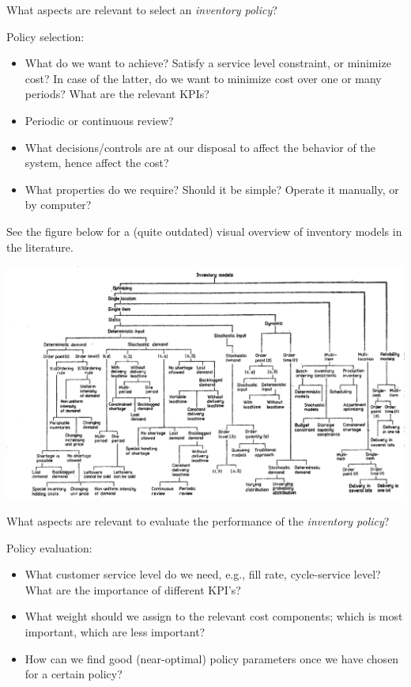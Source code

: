 \begin{exercise}
  What aspects are relevant to select an \emph{inventory policy}?
\begin{solution}
 Policy selection:
      \begin{itemize}
      \item What do we want to achieve? Satisfy a service level
        constraint, or minimize cost? In case of the latter, do we
        want to minimize cost over one or many periods? What are the relevant KPIs? 
      \item Periodic or continuous review?
      \item What decisions/controls are at our disposal to affect the
        behavior of the system, hence affect the cost?
      \item What properties do we require? Should it be simple?
        Operate it manually, or by computer? 
      \end{itemize}
See the figure below for a (quite outdated) visual overview of inventory models in the literature.

\centering
\includegraphics[width=\textwidth]{figures/chikan.png}
    \end{solution}
  \end{exercise}
  

\begin{exercise}
  What aspects are relevant to evaluate the performance of the \emph{inventory policy}?
\begin{solution}
Policy evaluation:
      \begin{itemize}
      \item What customer service level do we need, e.g., fill rate, cycle-service level? What are the importance of different KPI's?
      \item What weight  should we assign to the relevant cost components; which is most important, which are less important?
      \item How can we find good (near-optimal) policy parameters once we have chosen for a certain policy?
      \end{itemize}

  \end{solution}
\end{exercise}


